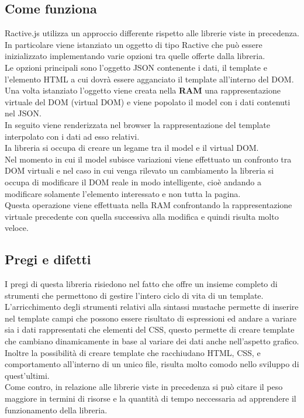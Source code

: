 \subsection{Come funziona}
Ractive.js utilizza un approccio differente rispetto alle librerie viste in precedenza.\\
In particolare viene istanziato un oggetto di tipo Ractive che può essere inizializzato implementando varie opzioni tra quelle offerte dalla libreria.\\
Le opzioni principali sono l'oggetto JSON contenente i dati, il template e l'elemento HTML a cui dovrà essere agganciato il template all'interno del DOM.\\
Una volta istanziato l'oggetto viene creata nella \textbf{RAM} una rappresentazione virtuale del DOM (virtual DOM) e viene popolato il model con i dati contenuti nel JSON.\\
In seguito viene renderizzata nel browser la rappresentazione del template interpolato con i dati ad esso relativi.\\
Ia libreria si occupa di creare un legame tra il model e il virtual DOM.\\
Nel momento in cui il model subisce variazioni viene effettuato un confronto tra DOM virtuali e nel caso in cui  venga rilevato un cambiamento la libreria si occupa di modificare il DOM reale in modo intelligente, cioè andando a modificare solamente l'elemento interessato e non tutta la pagina.\\
Questa operazione viene effettuata  nella RAM confrontando la rappresentazione virtuale precedente con quella successiva alla modifica e quindi risulta molto veloce.

\subsection{Pregi e difetti}
I pregi di questa libreria risiedono nel fatto che offre un insieme completo di strumenti che permettono di gestire l'intero ciclo di vita di un template.\\
L'arricchimento degli strumenti relativi alla sintassi mustache permette di inserire nel template campi che possono essere risultato di espressioni ed andare a variare sia i dati rappresentati che elementi del CSS, questo permette di creare template che cambiano dinamicamente in base al variare dei dati anche nell'aspetto grafico.\\
Inoltre la possibilità di creare template che racchiudano HTML, CSS, e comportamento all'interno di un unico file, risulta molto comodo nello sviluppo di quest'ultimi.\\  
Come contro, in relazione alle librerie viste in precedenza si può citare il peso maggiore in termini di risorse e la quantità di tempo neccessaria ad apprendere il funzionamento della libreria.


